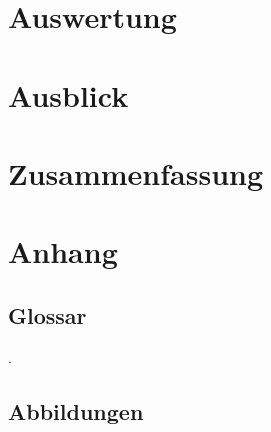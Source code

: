 \documentclass[12pt]{article}
\begin{document}
\newpage %

\section{Auswertung}
\label{sec:auswertung}


\newpage %

\section{Ausblick}
\label{sec:ausblick}


\newpage %

\section{Zusammenfassung}
\label{sec:zusammenfassung}


\newpage %

\cfoot{}
\section*{Anhang}
\label{sec:anhang}

\subsection*{Glossar}
\label{subsec:glossar}
\begingroup
\renewcommand{\section}[2]{}
\printglossary[style=tree]
\endgroup
\newpage

{\small\color{white}.}
\vspace{-2cm}
\subsection*{Abbildungen}
\label{subsec:abbildungen}
\begingroup
\renewcommand{\section}[2]{}
\listoffigures
\endgroup
\newpage
\end{document}
